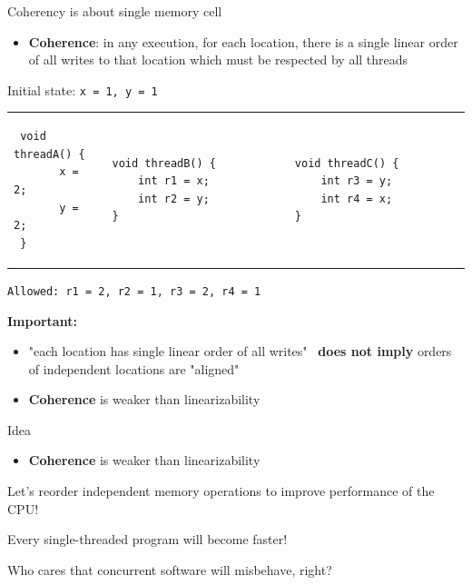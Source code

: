 \begin{frame}[t,fragile]{Coherency is about single memory cell}

\begin{itemize}
    \item \textbf{Coherence}: in any execution, for each location, there is a single linear order of all writes to that location which must be respected by all threads
\end{itemize}

\pause

Initial state: \texttt{x = 1, y = 1}
\begin{tabular}{p{} p{} p{}} 
 \begin{verbatim}
 void threadA() {
       x = 2;   
       y = 2;
 }
 \end{verbatim}
 &  
 \begin{verbatim}
 void threadB() {                                   
     int r1 = x;                           
     int r2 = y;                           
 }
 \end{verbatim}
 &
 \begin{verbatim}
 void threadC() {                                   
     int r3 = y;                           
     int r4 = x;                           
 }                   
 \end{verbatim}
\end{tabular}

\pause
\texttt{Allowed: r1 = 2, r2 = 1, r3 = 2, r4 = 1}

\pause
\textbf{Important:}
\begin{itemize}
    \item "each location has single linear order of all writes" \ \textbf{does not imply} orders of independent locations are "aligned"
    \pause
    \item \textbf{Coherence} is weaker than linearizability
\end{itemize}

\end{frame}

\begin{frame}[t,fragile]{Idea}

\begin{itemize}
    \item \textbf{Coherence} is weaker than linearizability
\end{itemize}

\pause

Let's reorder independent memory operations to improve performance of the CPU!

\pause
Every single-threaded program will become faster!

\pause
Who cares that concurrent software will misbehave, right?

\end{frame}


